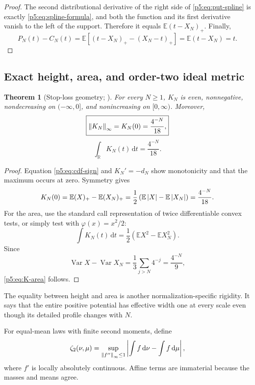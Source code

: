 \documentclass[11pt,oneside]{article}
\numberwithin{equation}{section}
\newtheorem{theorem}{Theorem}[section]
\theoremstyle{definition}
\theoremstyle{remark}
\newcommand{\R}{\mathbb R}
\newcommand{\E}{\mathbb E}
\newcommand{\Var}{\operatorname{Var}}
\newcommand{\dd}{\,\mathrm d}
\begin{document}
\begin{proof}
The second distributional derivative of the right side of \eqref{p5:eq:put-spline} is exactly \eqref{p5:eq:spline-formula}, and both the function and its first derivative vanish to the left of the support.  Therefore it equals $\E(t-X_N)_+$.  Finally,
\[
 P_N(t)-C_N(t)=\E[(t-X_N)_+-(X_N-t)_+]=\E(t-X_N)=t.
\]
\end{proof}

\subsection{Exact height, area, and order-two ideal metric}

\begin{theorem}[Stop-loss geometry; \newresult]
For every $N\ge1$, $K_N$ is even, nonnegative, nondecreasing on $(-\infty,0]$, and nonincreasing on $[0,\infty)$.  Moreover,
\begin{equation}
 \boxed{
 \left\lVert K_N\right\rVert_\infty=K_N(0)=\frac{4^{-N}}{18},}
 \label{p5:eq:K-height}
\end{equation}
\begin{equation}
 \boxed{
 \int_{\R}K_N(t)\dd t=\frac{4^{-N}}{18}.}
 \label{p5:eq:K-area}
\end{equation}
\end{theorem}

\begin{proof}
Equation \eqref{p5:eq:cdf-sign} and $K_N'=-d_N$ show monotonicity and that the maximum occurs at zero.  Symmetry gives
\[
 K_N(0)=\E(X)_+-\E(X_N)_+
 =\frac12\left(\E\abs X-\E\abs{X_N}\right)
 =\frac{4^{-N}}{18}.
\]
For the area, use the standard call representation of twice differentiable convex tests, or simply test with $\varphi(x)=x^2/2$:
\[
 \int K_N(t)\dd t
 =\frac12\left(\E X^2-\E X_N^2\right).
\]
Since
\[
 \Var X-\Var X_N=\frac13\sum_{j>N}4^{-j}=\frac{4^{-N}}9,
\]
\eqref{p5:eq:K-area} follows.
\end{proof}

The equality between height and area is another normalization-specific rigidity.  It says that the entire positive potential has effective width one at every scale even though its detailed profile changes with $N$.

\begin{definition}
For equal-mean laws with finite second moments, define
\begin{equation}
 \zeta_2(\nu,\mu)=
 \sup_{\norm{f''}_\infty\le1}
 \abs{\int f\dd\nu-\int f\dd\mu},
 \label{p5:eq:zeta2-def}
\end{equation}
where $f'$ is locally absolutely continuous.  Affine terms are immaterial because the masses and means agree.
\end{definition}
\end{document}
